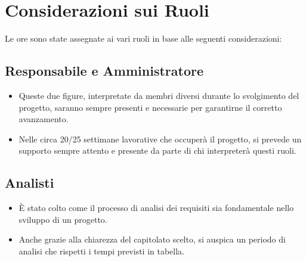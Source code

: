 \documentclass[11pt]{article}
\begin{document}
%    

\section{Considerazioni sui Ruoli}
Le ore sono state assegnate ai vari ruoli in base alle seguenti considerazioni:

\subsection{Responsabile e Amministratore}
    \begin{itemize}
        \item Queste due figure, interpretate da membri diversi durante lo svolgimento del progetto, saranno sempre presenti e necessarie per garantirne il corretto avanzamento. 
        \item Nelle circa 20/25 settimane lavorative che occuperà  il progetto, si prevede un supporto sempre attento e presente da parte di chi interpreterà questi ruoli.
    \end{itemize}
\subsection{Analisti}
    \begin{itemize}
        \item È stato colto come il processo di analisi dei requisiti sia fondamentale nello sviluppo di un progetto.
        \item Anche grazie alla chiarezza del capitolato scelto, si auspica un periodo di analisi che rispetti i tempi previsti in tabella.
    \end{itemize}
\end{document}
